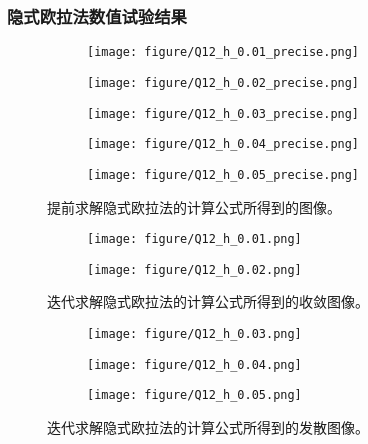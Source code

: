 \documentclass{article}
\begin{document}
\subsubsection{隐式欧拉法数值试验结果}
\begin{figure*}[h]
    \begin{subfigure}[h]{0.3\textwidth}
        \centering
        \texttt{[image: figure/Q12\_h\_0.01\_precise.png]}
    \end{subfigure}
    \begin{subfigure}[h]{0.3\textwidth}
        \centering
        \texttt{[image: figure/Q12\_h\_0.02\_precise.png]}
    \end{subfigure}
    \begin{subfigure}[h]{0.3\textwidth}
        \centering
        \texttt{[image: figure/Q12\_h\_0.03\_precise.png]}
    \end{subfigure}
    \centering
    \begin{subfigure}[h]{0.3\textwidth}
        \centering
        \texttt{[image: figure/Q12\_h\_0.04\_precise.png]}
    \end{subfigure}
    \centering
    \begin{subfigure}[h]{0.3\textwidth}
        \centering
        \texttt{[image: figure/Q12\_h\_0.05\_precise.png]}
    \end{subfigure}
    \caption{提前求解隐式欧拉法的计算公式所得到的图像。}
    \label{fig:implicit-precalculated}
\end{figure*}


\begin{figure*}[h]
    \centering
    \begin{subfigure}[h]{0.3\textwidth}
        \centering
        \texttt{[image: figure/Q12\_h\_0.01.png]}
    \end{subfigure}
    \centering
    \begin{subfigure}[h]{0.3\textwidth}
        \centering
        \texttt{[image: figure/Q12\_h\_0.02.png]}
    \end{subfigure}
    \caption{迭代求解隐式欧拉法的计算公式所得到的收敛图像。}
    \label{fig:implicit-convergence}
\end{figure*}
\begin{figure*}[h]
    \begin{subfigure}[h]{0.3\textwidth}
        \centering
        \texttt{[image: figure/Q12\_h\_0.03.png]}
    \end{subfigure}
    \begin{subfigure}[h]{0.3\textwidth}
        \centering
        \texttt{[image: figure/Q12\_h\_0.04.png]}
    \end{subfigure}
    \begin{subfigure}[h]{0.3\textwidth}
        \centering
        \texttt{[image: figure/Q12\_h\_0.05.png]}
    \end{subfigure}
    \caption{迭代求解隐式欧拉法的计算公式所得到的发散图像。}
    \label{fig:implicit-divergence}
\end{figure*}
\end{document}
